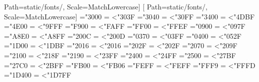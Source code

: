   Path=static/fonts/, Scale=MatchLowercase]
\newfontfamily{}[%
  Path=static/fonts/, Scale=MatchLowercase]
\newXeTeXintercharclass\bookcjkclass
\newXeTeXintercharclass\bookdevaclass
\newXeTeXintercharclass\bookfbclass
\makeatletter
\def\book@range#1#2#3{%
  \count@=#2\relax
  \loop
    \XeTeXcharclass\count@=#1\relax
  \ifnum\count@<#3\relax\advance\count@\@ne\repeat}
\book@range\bookcjkclass{"3000}{"303F}%
\book@range\bookcjkclass{"3040}{"30FF}%
\book@range\bookcjkclass{"3400}{"4DBF}%
\book@range\bookcjkclass{"4E00}{"9FFF}%
\book@range\bookcjkclass{"F900}{"FAFF}%
\book@range\bookcjkclass{"FF00}{"FFEF}%
\book@range\bookdevaclass{"0900}{"097F}%
\book@range\bookdevaclass{"A8E0}{"A8FF}%
\book@range\bookdevaclass{"200C}{"200D}%
\book@range\bookfbclass{"0370}{"03FF}%
\book@range\bookfbclass{"0400}{"052F}%
\book@range\bookfbclass{"1D00}{"1DBF}%
\book@range\bookfbclass{"2016}{"2016}%
\book@range\bookfbclass{"202F}{"202F}%
\book@range\bookfbclass{"2070}{"209F}%
\book@range\bookfbclass{"2100}{"218F}%
\book@range\bookfbclass{"2190}{"23FF}%
\book@range\bookfbclass{"2400}{"24FF}%
\book@range\bookfbclass{"2500}{"27BF}%
\book@range\bookfbclass{"27C0}{"2BFF}%
\book@range\bookfbclass{"FB00}{"FB06}%
\book@range\bookfbclass{"FEFF}{"FEFF}%
\book@range\bookfbclass{"FFF9}{"FFFD}%
\book@range\bookfbclass{"1D400}{"1D7FF}%
\def\book@fbtry#1#2{\iffontchar\font`#2\relax\else#1\fi}
\def\book@fb#1{%
  \begingroup
  \XeTeXinterchartokenstate=0\relax
  \iffontchar\font`#1\relax\else
    \edef\book@fam{\f@family}\edef\book@tt{\ttdefault}%
    \ifx\book@fam\book@tt\book@fbtry\bookfbmono{#1}\fi
    \book@fbtry\bookfbsans{#1}%
    \book@fbtry\bookfbmath{#1}%
  \fi
  #1\endgroup}
